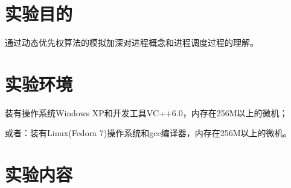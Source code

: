 \documentclass[c5size,a4paper,nofonts]{ctexart}
\begin{document}

\setcounter{part}{2}
\def\today{2015~年~6~月~4~日}


\iffalse
\section{实验目的}
通过动态优先权算法的模拟加深对进程概念和进程调度过程的理解。

\section{实验环境}
装有操作系统Windows XP和开发工具VC++6.0，内存在256M以上的微机；

或者：装有Linux(Fedora 7)操作系统和gcc编译器，内存在256M以上的微机。

\section{实验内容}
\end{document}
